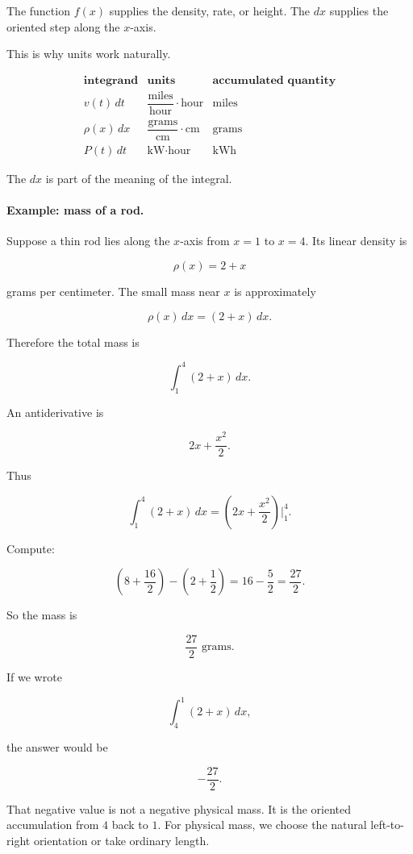 The function \(f(x)\) supplies the density, rate, or height.  The \(dx\) supplies the
oriented step along the \(x\)-axis.

This is why units work naturally.

\[
\begin{array}{c|c|c}
\textbf{integrand} & \textbf{units} & \textbf{accumulated quantity} \\ \hline
v(t)\,dt & \dfrac{\text{miles}}{\text{hour}}\cdot\text{hour} & \text{miles} \\[10pt]
\rho(x)\,dx & \dfrac{\text{grams}}{\text{cm}}\cdot\text{cm} & \text{grams} \\[10pt]
P(t)\,dt & \text{kW}\cdot\text{hour} & \text{kWh}
\end{array}
\]

The \(dx\) is part of the meaning of the integral.

\paragraph{Example: mass of a rod.}
Suppose a thin rod lies along the \(x\)-axis from \(x=1\) to \(x=4\).  Its linear density is

\[
\rho(x)=2+x
\]

grams per centimeter.  The small mass near \(x\) is approximately

\[
\rho(x)\,dx=(2+x)\,dx.
\]

Therefore the total mass is

\[
\int_1^4 (2+x)\,dx.
\]

An antiderivative is

\[
2x+\frac{x^2}{2}.
\]

Thus

\[
\int_1^4 (2+x)\,dx
=
\left(2x+\frac{x^2}{2}\right)\Big|_1^4.
\]

Compute:

\[
\left(8+\frac{16}{2}\right)-\left(2+\frac12\right)
=
16-\frac52
=
\frac{27}{2}.
\]

So the mass is

\[
\boxed{\frac{27}{2}\text{ grams}.}
\]

If we wrote

\[
\int_4^1 (2+x)\,dx,
\]

the answer would be

\[
-\frac{27}{2}.
\]

That negative value is not a negative physical mass.  It is the oriented accumulation
from \(4\) back to \(1\).  For physical mass, we choose the natural left-to-right
orientation or take ordinary length.

